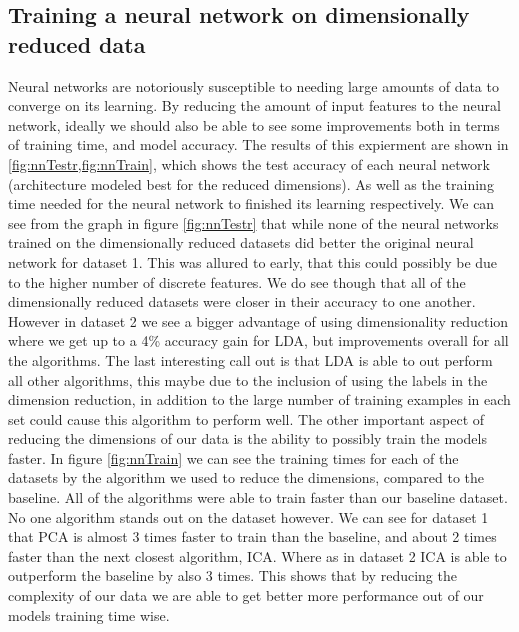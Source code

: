 \documentclass[
letterpaper, %
]{IEEEtran}
\begin{document}
	\subsection{Training a neural network on dimensionally reduced data}
	Neural networks are notoriously susceptible to needing large amounts of data to converge on its learning. By reducing the amount of input features to the neural network, ideally we should also be able to see some improvements both in terms of training time, and model accuracy. The results of this expierment are shown in \cref{fig:nnTestr,fig:nnTrain}, which shows the test accuracy of each neural network (architecture modeled best for the reduced dimensions). As well as the training time needed for the neural network to finished its learning respectively. We can see from the graph in figure \ref{fig:nnTestr} that while none of the neural networks trained on the dimensionally reduced datasets did better the original neural network for dataset 1. This was allured to early, that this could possibly be due to the higher number of discrete features. We do see though that all of the dimensionally reduced datasets were closer in their accuracy to one another. However in dataset 2 we see a bigger advantage of using dimensionality reduction where we get up to a 4\% accuracy gain for LDA, but improvements overall for all the algorithms. The last interesting call out is that LDA is able to out perform all other algorithms, this maybe due to the inclusion of using the labels in the dimension reduction, in addition to the large number of training examples in each set could cause this algorithm to perform well. The other important aspect of reducing the dimensions of our data is the ability to possibly train the models faster. In figure \ref{fig:nnTrain} we can see the training times for each of the datasets by the algorithm we used to reduce the dimensions, compared to the baseline. All of the algorithms were able to train faster than our baseline dataset. No one algorithm stands out on the dataset however. We can see for dataset 1 that PCA is almost 3 times faster to train than the baseline, and about 2 times faster than the next closest algorithm, ICA. Where as in dataset 2 ICA is able to outperform the baseline by also 3 times. This shows that by reducing the complexity of our data we are able to get better more performance out of our models training time wise.	
\end{document}
